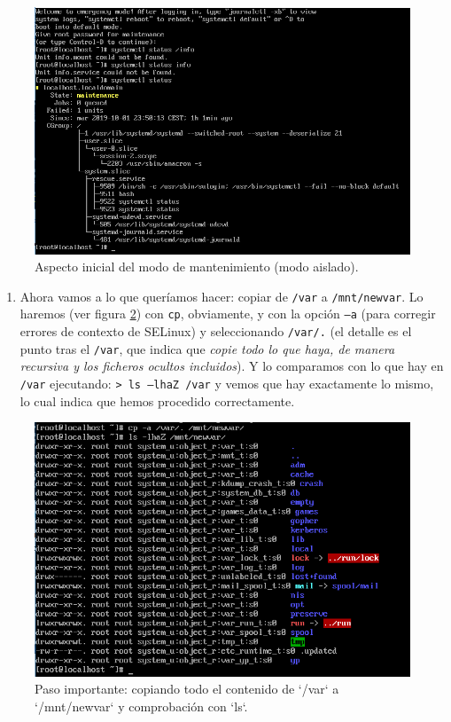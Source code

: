 \documentclass[
]{book}
\providecommand{\tightlist}{%
  \setlength{\itemsep}{0pt}\setlength{\parskip}{0pt}}
\begin{document}
\begin{figure}

{\centering \includegraphics[width=0.8\linewidth]{images/i} 

}

\caption{Aspecto inicial del modo de mantenimiento (modo aislado).}\label{fig:i}
\end{figure}

\begin{enumerate}
\def\labelenumi{\arabic{enumi}.}
\setcounter{enumi}{10}
\tightlist
\item
  Ahora vamos a lo que queríamos hacer: copiar de \texttt{/var} a \texttt{/mnt/newvar}. Lo haremos (ver figura \ref{fig:j}) con \texttt{cp}, obviamente, y con la opción \texttt{–a} (para corregir errores de contexto de SELinux) y seleccionando \texttt{/var/.} (el detalle es el punto tras el \texttt{/var}, que indica que \emph{copie todo lo que haya, de manera recursiva y los ficheros ocultos incluidos}). Y lo comparamos con lo que hay en \texttt{/var} ejecutando: \texttt{\textgreater{}\ ls\ –lhaZ\ /var} y vemos que hay exactamente lo mismo, lo cual indica que hemos procedido correctamente.
\end{enumerate}

\begin{figure}

{\centering \includegraphics[width=0.75\linewidth]{images/j} 

}

\caption{Paso importante: copiando todo el contenido de `/var` a `/mnt/newvar` y comprobación con `ls`.}\label{fig:j}
\end{figure}
\end{document}
